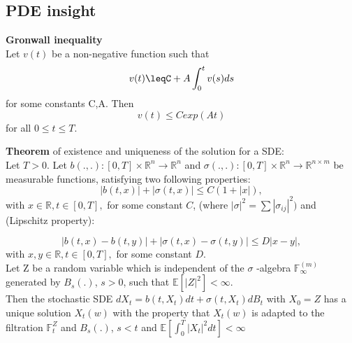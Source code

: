 \documentclass[a4paper]{report}
\begin{document}
\begin{itemize}
\subsection{PDE insight}
\textbf{Gronwall inequality}\\
Let $v(t)$ be a non-negative function such that 
\begin{equation}
v(t) \leqC+A\int_0^t v(s) ds
\end{equation}
for some constants C,A. Then 
\begin{equation}
v(t) \leq C exp (At)
\end{equation}
for all $0 \leq t \leq T$.\\
\newline



\textbf{Theorem} of existence and uniqueness of the solution for a SDE:\\
Let $T>0$. Let $b(.,.):[0,T] \times \mathbb{R}^n \longrightarrow \mathbb{R}^n$ and  $ \sigma(.,.):[0,T] \times \mathbb{R}^n \longrightarrow \mathbb{R}^{n \times m}$ be measurable functions, satisfying two following properties:
\begin{equation}
|b(t,x)|+|\sigma(t,x)| \leq C(1+|x|),  
\end{equation}
with  $ x\in \mathbb{R}, t\in [0,T],$ for some constant $C$, (where $|\sigma |^2=\sum|\sigma_{ij}|^2)$ and (Lipschitz property):

\begin{equation}
|b(t,x)-b(t,y)|+|\sigma(t,x)-\sigma(t,y)| \leq D |x-y|,  
\end{equation}
with  $ x, y \in \mathbb{R}, t\in [0,T],$ for some constant $D$.\\
Let Z be a random variable which is independent of the $\sigma$ -algebra $\mathbb{F}_\infty^{(m)}$ generated by $B_s(.)$, $s>0$,  such that  $\mathbb{E}[|Z|^2]<\infty$.\\
Then the stochastic SDE $dX_t = b(t,X_t)dt + \sigma(t, X_t)dB_t $  with $X_0=Z$ has a unique solution $X_t(w)$ with the property that $X_t(w)$ is adapted to the filtration $\mathbb{F}_t^Z$ and $B_s(.)$, $s<t$
 and $\mathbb{E}[\int_0^T |X_t|^2dt]<\infty$


\end{itemize}
\end{document}
